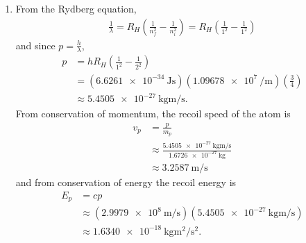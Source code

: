 \documentclass[a4paper,12pt]{article}
\begin{document}
\begin{enumerate}
    \item
        From the Rydberg equation,
        \begin{align*}
            \frac{1}{\lambda} = R_H \left( \frac{1}{n_f^2} - \frac{1}{n_i^2} \right) = R_H \left( \frac{1}{1^2} - \frac{1}{1^2} \right)
        \end{align*}
        and since $p = \frac{h}{\lambda}$,
        \begin{align*}
            p &= h R_H \left( \frac{1}{1^2} - \frac{1}{2^2} \right) \\
            &= (\SI{6.6261e-34}{\J\s}) (\SI{1.09678e7}{\per\metre}) \left( \frac{3}{4} \right) \\
            &\approx \SI{5.4505e-27}{\kg\m\per\s}.
        \end{align*}
        From conservation of momentum, the recoil speed of the atom is
        \begin{align*}
            v_p &= \frac{p}{m_p} \\
            &\approx \frac{\SI{5.4505e-27}{\kg\m\per\s}}{\SI{1.6726e-27}{\kg}} \\
            &\approx \SI{3.2587}{\m\per\s}
        \end{align*}
        and from conservation of energy the recoil energy is
        \begin{align*}
            E_p &= cp \\
            &\approx (\SI{2.9979e8}{\m\per\s}) (\SI{5.4505e-27}{\kg\m\per\s}) \\
            &\approx \SI{1.6340e-18}{\kg\m\squared\per\s\squared}.
        \end{align*}
	
\end{enumerate}
\end{document}
